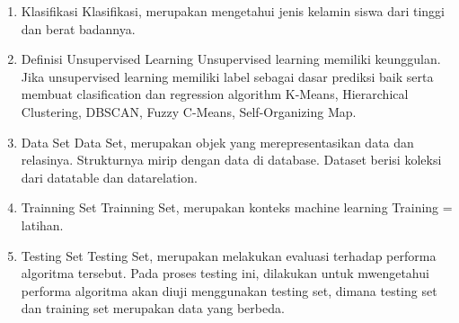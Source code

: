\begin{enumerate}
	\item Klasifikasi
	\hfill\break
	Klasifikasi, merupakan mengetahui jenis kelamin siswa dari tinggi dan berat badannya.

	\item Definisi Unsupervised Learning
	\hfill\break
	Unsupervised learning memiliki keunggulan. Jika unsupervised learning memiliki label sebagai dasar prediksi baik serta membuat clasification dan regression algorithm K-Means, Hierarchical Clustering, DBSCAN, Fuzzy C-Means, Self-Organizing Map.

	\item Data Set
	\hfill\break
	Data Set, merupakan objek yang merepresentasikan data dan relasinya. Strukturnya mirip dengan data di database. Dataset berisi koleksi dari datatable dan datarelation.

	\item Trainning Set
	\hfill\break
	Trainning Set, merupakan konteks machine learning Training = latihan.

	\item Testing Set
	\hfill\break
	Testing Set, merupakan melakukan evaluasi terhadap performa algoritma tersebut. Pada proses testing ini, dilakukan untuk mwengetahui performa algoritma akan diuji menggunakan testing set, dimana testing set dan training set merupakan data yang berbeda.

\end{enumerate}


